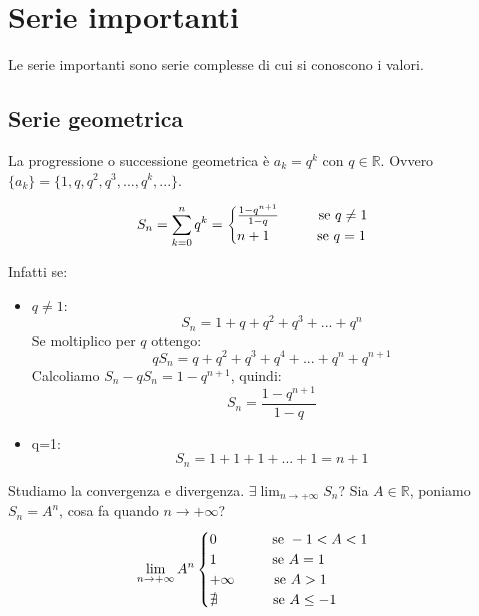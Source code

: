 \section{Serie importanti}
Le serie importanti sono serie complesse di cui si conoscono i valori.
\subsection*{Serie geometrica}
La progressione o successione geometrica è $a_k=q^k$ con $q\in\mathbb{R}$. Ovvero $\{a_k\}=\{1,q,q^2,q^3,...,q^k,...\}$.


$$S_n=\sum^n_{k=0}q^k=\begin{cases}
        \frac{1-q^{n+1}}{1-q}\hspace{1cm}\text{se }q\neq1\\
        n+1\hspace{1.2cm}\text{se }q=1
\end{cases}$$

Infatti se:
\begin{itemize}
    \item $q\neq1$:\begin{equation*}S_n=1+q+q^2+q^3+...+q^n\end{equation*}Se moltiplico per $q$ ottengo:\begin{equation*}qS_n=q+q^2+q^3+q^4+...+q^n+q^{n+1}\end{equation*}Calcoliamo $S_n-qS_n=1-q^{n+1}$, quindi:\begin{equation*}S_n=\frac{1-q^{n+1}}{1-q}\end{equation*}
    \item q=1:\begin{equation*}S_n=1+1+1+...+1=n+1\end{equation*}
\end{itemize}

Studiamo la convergenza e divergenza. $\exists\lim_{n\to+\infty}S_n$? Sia $A\in\mathbb{R}$, poniamo $S_n=A^n$, cosa fa quando $n\to+\infty$?
$$\lim_{n\to+\infty}A^n\begin{cases}
    0\hspace{1.4cm}\text{se } -1<A<1\\
    1\hspace{1.4cm}\text{se }  A=1\\
    +\infty\hspace{1cm}\text{se } A>1\\
    \nexists\hspace{1.4cm}\text{se } A\leq-1
\end{cases}$$

